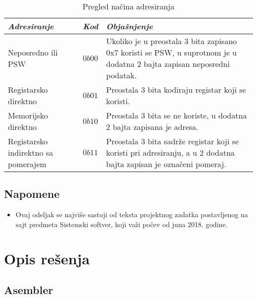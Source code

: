 \begin{table}[h!]
\centering
\small

    \begin{tabu}{ | X[l] | X[l] | X[l] | }
        \hline
        \textbf{\textit{Adresiranje}} &
        \textbf{\textit{Kod}} &
        \textbf{\textit{Objašnjenje}} \\
        \hline
        \hline

        Neposredno ili PSW & $0b00$ &
        Ukoliko je u preostala 3 bita zapisano 0x7 koristi se PSW,
        u suprotnom je u dodatna 2 bajta zapisan neposredni podatak. \\
        \hline

        Registarsko direktno & $0b01$ &
        Preostala 3 bita kodiraju registar koji se koristi. \\
        \hline

        Memorijsko direktno & $0b10$ &
        Preostala 3 bita se ne koriste, u dodatna 2 bajta zapisana je
        adresa. \\
        \hline

        Registarsko indirektno sa pomerajem & $0b11$ &
        Preostala 3 bita sadrže registar koji se koristi pri adresiranju,
        a u 2 dodatna bajta zapisan je označeni pomeraj. \\
        \hline
    \end{tabu}
    \caption{Pregled načina adresiranja}
    \label{table:3}
\end{table}

\subsection{Napomene}
\begin{itemize}
    \item Ovaj odeljak se najviše sastoji od teksta projektnog zadatka
          postavlje\-nog na sajt predmeta Sistemski softver, koji važi počev
          od juna 2018. godine.
\end{itemize}



\newpage
\section{Opis rešenja}

\subsection{Asembler}

